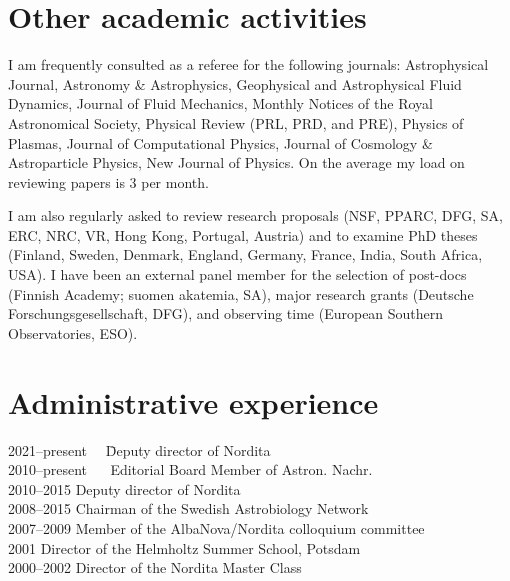 \documentclass{article}
\begin{document}
\section*{Other academic activities}

I am frequently consulted as a referee for the following journals:
Astrophysical Journal, Astronomy \& Astrophysics, Geophysical and
Astrophysical Fluid Dynamics, Journal of Fluid Mechanics,
Monthly Notices of the Royal Astronomical Society,
Physical Review (PRL, PRD, and PRE), Physics of Plasmas,
Journal of Computational Physics,
Journal of Cosmology \& Astroparticle Physics,
New Journal of Physics.
On the average my load on reviewing papers is 3 per month.

I am also regularly asked to review research proposals
(NSF, PPARC, DFG, SA, ERC, NRC, VR, Hong Kong, Portugal, Austria)
and to examine PhD theses (Finland, Sweden, Denmark, England, Germany,
France, India, South Africa, USA).
I have been an external panel member for the selection of post-docs
(Finnish Academy; suomen akatemia, SA),
major research grants (Deutsche Forschungsgesellschaft, DFG),
and observing time (European Southern Observatories, ESO).


\section*{Administrative experience}

\begin{tabbing}
2021--present ~~\= Deputy director of Nordita \\
2010--present ~~\> Editorial Board Member of Astron. Nachr.\\
2010--2015      \> Deputy director of Nordita \\
2008--2015      \> Chairman of the Swedish Astrobiology Network \\
2007--2009      \> Member of the AlbaNova/Nordita colloquium committee\\
2001            \> Director of the Helmholtz Summer School, Potsdam \\
2000--2002      \> Director of the Nordita Master Class\\
\end{tabbing}
\vspace{-8mm}
\end{document}
